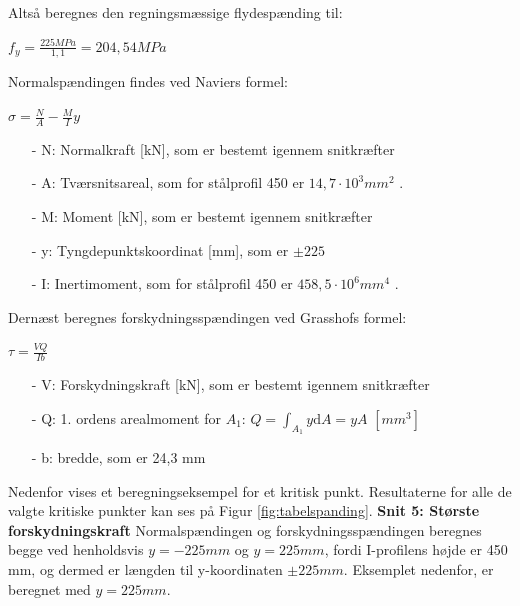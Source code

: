 Altså beregnes den regningsmæssige flydespænding til:

\begin{center}
	$f_y = \frac{225 MPa}{1,\!1} = 204,\!54 MPa$
\end{center}

Normalspændingen findes ved Naviers formel:

\begin{center}
	$\sigma = \frac{N}{A} - \frac{M}{I} y$
\end{center}

\begin{itemize}
	\item[-] N: Normalkraft [kN], som er bestemt igennem snitkræfter
	\item[-] A: Tværsnitsareal, som for stålprofil 450 er $14,\!7 \cdot 10^3 mm^2$ \citep{stabi}. 
	\item[-] M: Moment [kN], som er bestemt igennem snitkræfter
	\item[-] y: Tyngdepunktskoordinat [mm], som er $\pm 225$
	\item[-] I: Inertimoment, som for stålprofil 450 er $458,\!5 \cdot 10^6 mm^4$ \citep{stabi}. 
\end{itemize} 

Dernæst beregnes forskydningsspændingen ved Grasshofs formel:

\begin{center}
	$\tau = \frac{VQ}{Ib}$
\end{center}

\begin{itemize}
	\item[-] V: Forskydningskraft [kN], som er bestemt igennem snitkræfter
	\item[-] Q: 1. ordens arealmoment for $A_1$: $Q = \int_{A_1}y \mathrm{d}A = yA$ $[mm^3]$
	\item[-] b: bredde, som er 24,3 mm
\end{itemize}

Nedenfor vises et beregningseksempel for et kritisk punkt. Resultaterne for alle de valgte kritiske punkter kan ses på Figur \ref{fig:tabelspanding}. 
\newline
\newline
\textbf{Snit 5: Største forskydningskraft}
Normalspændingen og forskydningsspændingen beregnes begge ved henholdsvis $y = -225 mm$ og $y = 225 mm$, fordi I-profilens højde er 450 mm, og dermed er længden til y-koordinaten $\pm 225 mm$. Eksemplet nedenfor, er beregnet med $y = 225 mm$.

